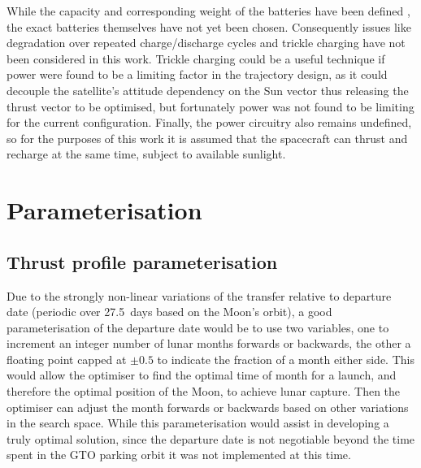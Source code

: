 While the capacity and corresponding weight of the batteries have been defined \parencite{Roeser2006}, the exact batteries themselves have not yet been chosen. Consequently issues like degradation over repeated charge/discharge cycles and trickle charging have not been considered in this work. Trickle charging could be a useful technique if power were found to be a limiting factor in the trajectory design, as it could decouple the satellite's attitude dependency on the Sun vector thus releasing the thrust vector to be optimised, but fortunately power was not found to be limiting for the current configuration. Finally, the power circuitry also remains undefined, so for the purposes of this work it is assumed that the spacecraft can thrust and recharge at the same time, subject to available sunlight.



\section{Parameterisation} \label{sec:Parameterisation}




\subsection{Thrust profile parameterisation} \label{sub:Thrust-parameterisation}

Due to the strongly non-linear variations of the transfer relative to departure date (periodic over 27.5~days based on the Moon's orbit), a good parameterisation of the departure date would be to use two variables, one to increment an integer number of lunar months forwards or backwards, the other a floating point capped at $\pm 0.5$ to indicate the fraction of a month either side. This would allow the optimiser to find the optimal time of month for a launch, and therefore the optimal position of the Moon, to achieve lunar capture. Then the optimiser can adjust the month forwards or backwards based on other variations in the search space. While this parameterisation would assist in developing a truly optimal solution, since the departure date is not negotiable beyond the time spent in the GTO parking orbit it was not implemented at this time.

